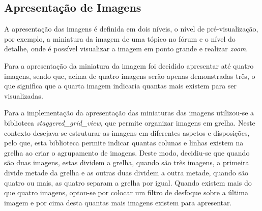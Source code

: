 \subsection{Apresentação de Imagens}
A apresentação das imagens é definida em dois níveis, o nível de pré-visualização, por exemplo, a miniatura da imagem de uma tópico no fórum e o nível do detalhe, onde é possível visualizar a imagem em ponto grande e realizar \textit{zoom}.

Para a apresentação da miniatura da imagem foi decidido apresentar até quatro imagens, sendo que, acima de quatro imagens serão apenas demonstradas três, o que significa que a quarta imagem indicaria quantas mais existem para ser visualizadas. 

Para a implementação da apresentação das miniaturas das imagens utilizou-se a biblioteca \textit{staggered\_grid\_view}, que permite organizar imagens em grelha. Neste contexto desejava-se estruturar as imagens em diferentes aspetos e disposições, pelo que, esta biblioteca permite indicar quantas colunas e linhas existem na grelha ao criar o agrupamento de imagens. Deste modo, decidiu-se que quando são duas imagens, estas dividem a grelha, quando são três imagens, a primeira divide metade da grelha e as outras duas dividem a outra metade, quando são quatro ou mais, as quatro separam a grelha por igual. Quando existem mais do que quatro imagens, optou-se por colocar um filtro de desfoque sobre a última imagem e por cima desta quantas mais imagens existem para apresentar.


